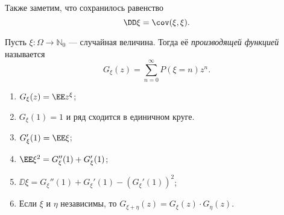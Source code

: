  Также заметим, что сохранилось равенство
 $$\DD\xi = \cov (\xi, \xi).$$

 \begin{definition}
     Пусть $\xi \colon \Omega\rightarrow \mathbb{N}_0$ --- случайная величина. Тогда её \textit{производящей функцией} называется
     $$G_\xi(z)= \overset{\infty}{\underset{n = 0}{\sum}} P(\xi = n)z^n.$$
 \end{definition}

 \begin{properties}
\enewline
     \begin{enumerate}
         \item $G_\xi(z) = \EE z^\xi$;

         \item $G_\xi(1) = 1$ и ряд сходится в единичном круге.

         \item $G_\xi'(1) = \EE \xi$;

         \item $\EE \xi^2 = G_\xi''(1) + G_\xi'(1)$;

         \item $\DD\xi = G_\xi''(1) + G_\xi'(1) - (G_\xi'(1))^2$;

         \item Если $\xi$ и $\eta$ независимы, то $G_{\xi + \eta}(z) = G_\xi(z)\cdot G_\eta(z)$.

            
     \end{enumerate}
 \end{properties}
